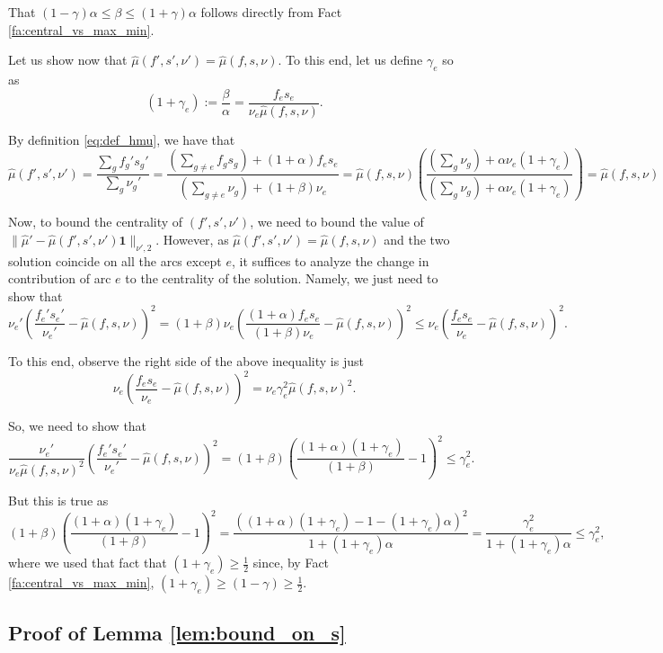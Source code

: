 \documentclass[11pt, letterpaper]{article}
\newcommand{\onev}{\mathbf{1}}
\newcommand{\norm}[2]{\|#1\|_{#2}}
\newcommand{\hmu}{\hat{\mu}}
\newcommand{\vnu}{\boldsymbol{\mathit{\nu}}}
\newcommand{\hvmu}{\boldsymbol{\mathit{\hat{\mu}}}}
\newcommand{\ff}{\boldsymbol{\mathit{f}}}
\renewcommand{\ss}{\boldsymbol{\mathit{s}}}
\begin{document}
That $(1-\gamma)\alpha \leq \beta \leq (1+\gamma)\alpha$ follows directly from Fact \ref{fa:central_vs_max_min}.

Let us show now that $\hmu(\ff',\ss',\vnu')= \hmu(\ff,\ss,\vnu)$. To this end, let us define $\gamma_e$ so as 
\[
(1+\gamma_e):= \frac{\beta}{\alpha} = \frac{f_e s_e}{\nu_e\hmu(\ff,\ss,\vnu)}.
\]

By definition \eqref{eq:def_hmu}, we have that
\[
\hmu(\ff',\ss',\vnu') = \frac{\sum_g f_g' s_g'}{\sum_g \nu_g'} =  \frac{(\sum_{g\neq e} f_g s_g) + (1+\alpha) f_e s_e }{(\sum_{g\neq e} \nu_g) + (1+\beta) \nu_e}=\hmu(\ff,\ss,\vnu)\left(\frac{(\sum_{g} \nu_g) + \alpha \nu_e (1+\gamma_e) }{(\sum_{g} \nu_g) + \alpha \nu_e (1+\gamma_e)}\right)=\hmu(\ff,\ss,\vnu)
\]

Now, to bound the centrality of $(\ff',\ss',\vnu')$, we need to bound the value of $\norm{\hvmu'-\hmu(\ff',\ss',\vnu')\onev}{\vnu',2}$. However, as $\hmu(\ff',\ss',\vnu')= \hmu(\ff,\ss,\vnu)$ and the two solution coincide on all the arcs except $e$, it suffices to analyze the change in contribution of arc $e$ to the centrality of the solution. Namely, we just need to show that 
\[
\nu_e' \left(\frac{f_e's_e'}{\nu_e'} - \hmu(\ff,\ss,\vnu)\right)^2 = (1+\beta)\nu_e \left(\frac{(1+\alpha)f_es_e}{(1+\beta)\nu_e} - \hmu(\ff,\ss,\vnu)\right)^2\leq \nu_e (\frac{f_es_e}{\nu_e} - \hmu(\ff,\ss,\vnu))^2.
\]

To this end, observe the right side of the above inequality is just
\[
\nu_e \left(\frac{f_es_e}{\nu_e} - \hmu(\ff,\ss,\vnu)\right)^2=\nu_e \gamma_e^2\hmu(\ff,\ss,\vnu)^2.
\]

So, we need to show that 
\[
\frac{\nu_e'}{\nu_e\hmu(\ff,\ss,\vnu)^2} \left(\frac{f_e's_e'}{\nu_e'} - \hmu(\ff,\ss,\vnu)\right)^2 =  (1+\beta)\left(\frac{(1+\alpha)(1+\gamma_e)}{(1+\beta)} - 1\right)^2\leq \gamma_e^2.
\]


But this is true as 
\[
(1+\beta)\left(\frac{(1+\alpha)(1+\gamma_e)}{(1+\beta)} - 1\right)^2=\frac{\left((1+\alpha)(1+\gamma_e)-1-(1+\gamma_e)\alpha\right)^2}{1+(1+\gamma_e)\alpha}=\frac{\gamma_e^2}{1+(1+\gamma_e)\alpha}\leq \gamma_e^2,
\]
where we used that fact that $(1+\gamma_e)\geq \frac{1}{2}$ since, by Fact \ref{fa:central_vs_max_min}, $(1+\gamma_e)\geq (1-\gamma)\geq \frac{1}{2}$. 

\subsection{Proof of Lemma \ref{lem:bound_on_s}}\label{app:bound_on_s}
\end{document}
